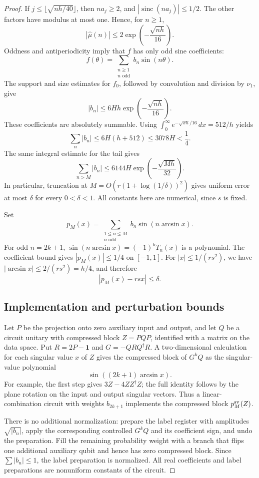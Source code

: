 \documentclass[11pt]{article}
\newcommand{\id}{\mathbf 1}
\begin{document}
\begin{proof}
If $j\leq\lfloor\sqrt{nh/40}\rfloor$, then $na_j\geq2$, and
$|\operatorname{sinc}(na_j)|\leq1/2$. The other factors have modulus
at most one. Hence, for $n\geq1$,
\[
 |\widehat\mu(n)|\leq
 2\exp\!\left(-\frac{\sqrt{nh}}{16}\right).
\]
Oddness and antiperiodicity imply that $f$ has only odd sine coefficients:
\[
 f(\theta)=\sum_{\substack{n\geq1\\n\text{ odd}}}b_n\sin(n\theta).
\]
The support and size estimates for $f_0$, followed by convolution and
division by $\nu_1$, give
\[
 |b_n|\leq6Hh\exp\!\left(-\frac{\sqrt{nh}}{16}\right).
\]
These coefficients are absolutely summable. Using
$\int_0^\infty e^{-\sqrt{xh}/16}\,dx=512/h$ yields
\[
 \sum_n|b_n|\leq6H(h+512)\leq3078H<\frac14.
\]
The same integral estimate for the tail gives
\[
 \sum_{n>M}|b_n|
 \leq6144H\exp\!\left(-\frac{\sqrt{Mh}}{32}\right).
\]
In particular, truncation at
$M=O(r(1+\log(1/\delta))^2)$ gives uniform error at most $\delta$
for every $0<\delta<1$.
All constants here are numerical, since $s$ is fixed.

Set
\[
 p_M(x)=\sum_{\substack{1\leq n\leq M\\n\text{ odd}}}
             b_n\sin(n\arcsin x).
\]
For odd $n=2k+1$, $\sin(n\arcsin x)=(-1)^kT_n(x)$ is a polynomial.
The coefficient bound gives $|p_M(x)|\leq1/4$ on $[-1,1]$.
For $|x|\leq1/(rs^2)$, we have
$|\arcsin x|\leq2/(rs^2)=h/4$, and therefore
\[
 |p_M(x)-rsx|\leq\delta.
\]

\subsection{Implementation and perturbation bounds}

Let $P$ be the projection onto zero auxiliary input and output, and let
$Q$ be a circuit unitary with compressed block $Z=PQP$, identified with
a matrix on the data space. Put $R=2P-\id$ and
$G=-QRQ^\dagger R$. A two-dimensional calculation for each singular
value $x$ of $Z$ gives the compressed block of $G^kQ$ as the
singular-value polynomial
\[
 \sin((2k+1)\arcsin x).
\]
For example, the first step gives $3Z-4ZZ^\dagger Z$; the full identity
follows by the plane rotation on the input and output singular vectors.
Thus a linear-combination circuit with weights $b_{2k+1}$ implements
the compressed block $p_M^{\rm sv}(Z)$.

There is no additional normalization: prepare the label register with
amplitudes $\sqrt{|b_n|}$, apply the corresponding controlled $G^kQ$
and its coefficient sign, and undo the preparation. Fill the remaining
probability weight with a branch that flips one additional auxiliary
qubit and hence has zero compressed block. Since $\sum|b_n|\leq1$,
the label preparation is normalized. All real coefficients and label
preparations are nonuniform constants of the circuit.


\end{proof}
\end{document}
